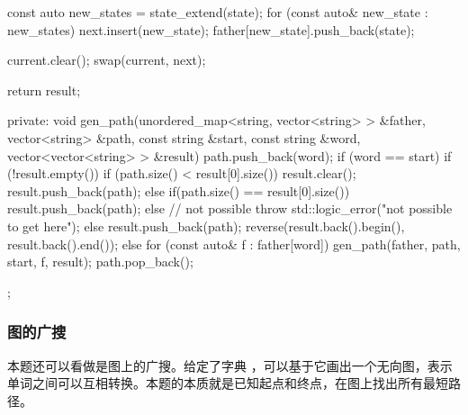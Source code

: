 \begin{Code}
{{{{                const auto new_states = state_extend(state);
                for (const auto& new_state : new_states) {
                    next.insert(new_state);
                    father[new_state].push_back(state);
                }
            }

            current.clear();
            swap(current, next);
        }

        return result;
    }
private:
    void gen_path(unordered_map<string, vector<string> > &father,
            vector<string> &path, const string &start, const string &word,
            vector<vector<string> > &result) {
        path.push_back(word);
        if (word == start) {
            if (!result.empty()) {
                if (path.size() < result[0].size()) {
                    result.clear();
                    result.push_back(path);
                } else if(path.size() == result[0].size()) {
                    result.push_back(path);
                } else {
                    // not possible
                    throw std::logic_error("not possible to get here");
                }
            } else {
                result.push_back(path);
            }
            reverse(result.back().begin(), result.back().end());
        } else {
            for (const auto& f : father[word]) {
                gen_path(father, path, start, f, result);
            }
        }
        path.pop_back();
    }
};
\end{Code}


\subsubsection{图的广搜}

本题还可以看做是图上的广搜。给定了字典 ，可以基于它画出一个无向图，表示单词之间可以互相转换。本题的本质就是已知起点和终点，在图上找出所有最短路径。

